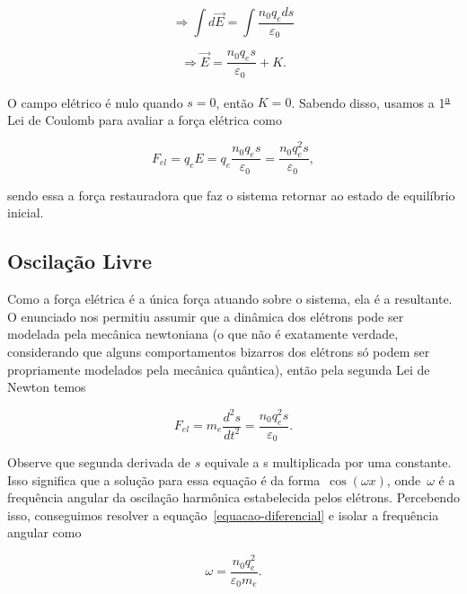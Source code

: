 \documentclass[
	article,
	11pt,
	oneside,
	a4paper,
	english,
	brazil,
	sumario=tradicional
	]{abntex2}
\begin{document}
\begin{equation}
  \Rightarrow \int d\vec{E} = \int \frac{n_0 q_e ds}{\varepsilon _0~}
\end{equation}

\begin{equation} \label{campo-eletrico}
  \Rightarrow \vec{E} = \frac{n_0 q_e s}{\varepsilon _0~} + K.
\end{equation}

\noindent O campo elétrico é nulo quando $s=0$, então $K=0$. Sabendo disso, usamos a 1\textsuperscript{\underline{a}} Lei de Coulomb para avaliar a força elétrica como

\begin{equation} \label{forca-restauradora}
  F_{el} = q_eE = q_e \frac{n_0 q_e s}{\varepsilon _0~} = \frac{n_0 q_e^2 s}{\varepsilon _0~},
\end{equation}

\noindent sendo essa a força restauradora que faz o sistema retornar ao estado de equilíbrio inicial.

\subsection{Oscilação Livre}

Como a força elétrica é a única força atuando sobre o sistema, ela é a resultante. O enunciado nos permitiu assumir que a dinâmica dos elétrons pode ser modelada pela mecânica newtoniana (o que não é exatamente verdade, considerando que alguns comportamentos bizarros dos elétrons só podem ser propriamente modelados pela mecânica quântica), então pela segunda Lei de Newton temos

\begin{equation} \label{equacao-diferencial}
  F_{el} =  m_e \frac{d^2s}{dt^2} = \frac{n_0 q_e^2 s}{\varepsilon _0~}.
\end{equation}

\noindent Observe que segunda derivada de $s$ equivale a s multiplicada por uma constante. Isso significa que a solução para essa equação é da forma~$\cos(\omega x)$, onde~$\omega$ é a frequência angular da oscilação harmônica estabelecida pelos elétrons. Percebendo isso, conseguimos resolver a equação~\ref{equacao-diferencial} e isolar a frequência angular como

\begin{equation}
  \omega = \frac{n_0 q_e^2}{\varepsilon_0 m_e}.
\end{equation}
\end{document}
